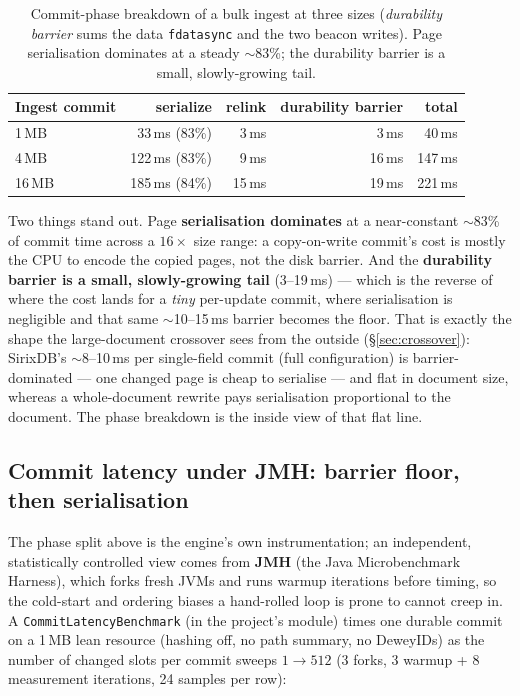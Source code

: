 \documentclass[11pt,a4paper,oneside]{report}
\theoremstyle{sirixthm}
\newcommand{\code}[1]{\texttt{#1}}
\begin{document}
\begin{table}[h]
\centering\footnotesize\setlength{\tabcolsep}{7pt}\renewcommand{\arraystretch}{1.25}
\begin{tabular}{@{}l r r r r@{}}
\toprule
\textbf{Ingest commit} & \textbf{serialize} & \textbf{relink} & \textbf{durability barrier} & \textbf{total}\\
\midrule
1\,MB  & 33\,ms (83\%)  & 3\,ms  & 3\,ms  & 40\,ms\\
4\,MB  & 122\,ms (83\%) & 9\,ms  & 16\,ms & 147\,ms\\
16\,MB & 185\,ms (84\%) & 15\,ms & 19\,ms & 221\,ms\\
\bottomrule
\end{tabular}
\caption{Commit-phase breakdown of a bulk ingest at three sizes (\emph{durability barrier} sums the data
\code{fdatasync} and the two beacon writes). Page serialisation dominates at a steady $\sim$83\%; the
durability barrier is a small, slowly-growing tail.}
\label{tab:commitphases}
\end{table}

Two things stand out. Page \textbf{serialisation dominates} at a near-constant $\sim$83\% of commit time
across a $16\times$ size range: a copy-on-write commit's cost is mostly the CPU to encode the copied
pages, not the disk barrier. And the \textbf{durability barrier is a small, slowly-growing tail}
(3--19\,ms) --- which is the reverse of where the cost lands for a \emph{tiny} per-update commit, where
serialisation is negligible and that same $\sim$10--15\,ms barrier becomes the floor. That is exactly the
shape the large-document crossover sees from the outside (\S\ref{sec:crossover}): SirixDB's
$\sim$8--10\,ms per single-field commit (full configuration) is barrier-dominated --- one changed page is
cheap to serialise --- and flat in document size, whereas a whole-document rewrite pays serialisation
proportional to the document. The phase breakdown is the inside view of that flat line.

\subsection*{Commit latency under JMH: barrier floor, then serialisation}

The phase split above is the engine's own instrumentation; an independent, statistically controlled view
comes from \textbf{JMH} (the Java Microbenchmark Harness), which forks fresh JVMs and runs warmup
iterations before timing, so the cold-start and ordering biases a hand-rolled loop is prone to cannot
creep in. A \code{CommitLatencyBenchmark} (in the project's  module) times one durable
commit on a 1\,MB lean resource (hashing off, no path summary, no DeweyIDs) as the number of changed slots
per commit sweeps $1\to512$ (3 forks, 3 warmup {+} 8 measurement iterations, 24 samples per row):
\end{document}
